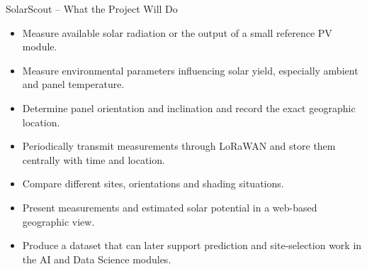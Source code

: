 \begin{frame}{SolarScout -- What the Project Will Do}
\small
\begin{itemize}
    \item Measure available solar radiation or the output of a small reference PV module.
    \item Measure environmental parameters influencing solar yield, especially ambient and panel temperature.
    \item Determine panel orientation and inclination and record the exact geographic location.
    \item Periodically transmit measurements through LoRaWAN and store them centrally with time and location.
    \item Compare different sites, orientations and shading situations.
    \item Present measurements and estimated solar potential in a web-based geographic view.
    \item Produce a dataset that can later support prediction and site-selection work in the AI and Data Science modules.
\end{itemize}
\end{frame}
